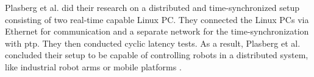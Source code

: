Plasberg et al. did their research on a distributed and time-synchronized setup consisting of two real-time capable Linux PC. They connected the Linux PCs via Ethernet for communication and a separate network for the time-synchronization with \gls{ptp}. They then conducted cyclic latency tests. As a result, Plasberg et al. concluded their setup to be capable of controlling robots in a distributed system, like industrial robot arms or mobile platforms \cite{plasberg_towards_2022}.



